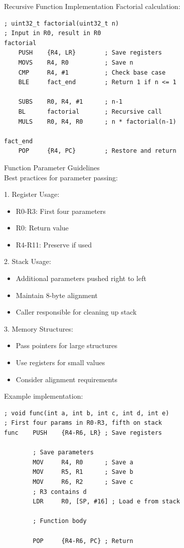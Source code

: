 \begin{example2}{Recursive Function Implementation}
Factorial calculation:
\begin{lstlisting}[language=armasm, style=basesmol]
; uint32_t factorial(uint32_t n)
; Input in R0, result in R0
factorial
    PUSH    {R4, LR}        ; Save registers
    MOVS    R4, R0          ; Save n
    CMP     R4, #1          ; Check base case
    BLE     fact_end        ; Return 1 if n <= 1
    
    SUBS    R0, R4, #1      ; n-1
    BL      factorial       ; Recursive call
    MULS    R0, R4, R0      ; n * factorial(n-1)
    
fact_end
    POP     {R4, PC}        ; Restore and return
\end{lstlisting}
\end{example2}

\begin{KR}{Function Parameter Guidelines}\\
Best practices for parameter passing:

1. Register Usage:
\begin{itemize}
  \item R0-R3: First four parameters
  \item R0: Return value
  \item R4-R11: Preserve if used
\end{itemize}

2. Stack Usage:
\begin{itemize}
  \item Additional parameters pushed right to left
  \item Maintain 8-byte alignment
  \item Caller responsible for cleaning up stack
\end{itemize}

3. Memory Structures:
\begin{itemize}
  \item Pass pointers for large structures
  \item Use registers for small values
  \item Consider alignment requirements
\end{itemize}

Example implementation:
\begin{lstlisting}[language=armasm, style=basesmol]
; void func(int a, int b, int c, int d, int e)
; First four params in R0-R3, fifth on stack
func    PUSH    {R4-R6, LR} ; Save registers
        
        ; Save parameters
        MOV     R4, R0      ; Save a
        MOV     R5, R1      ; Save b
        MOV     R6, R2      ; Save c
        ; R3 contains d
        LDR     R0, [SP, #16] ; Load e from stack
        
        ; Function body
        
        POP     {R4-R6, PC} ; Return
\end{lstlisting}
\end{KR}

